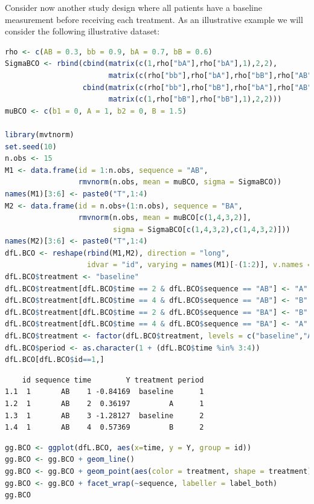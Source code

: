 \documentclass[12pt]{article}
\begin{document}
Consider now another study design where all patients have a baseline
measurement before receiving each treatment. As an illustrative
example we will consider the following illustrative dataset:
\begin{lstlisting}[language=r,numbers=none]
rho <- c(AB = 0.3, bb = 0.9, bA = 0.7, bB = 0.6)
SigmaBCO <- rbind(cbind(matrix(c(1,rho["bA"],rho["bA"],1),2,2),
                        matrix(c(rho["bb"],rho["bA"],rho["bB"],rho["AB"]),2,2)),
                  cbind(matrix(c(rho["bb"],rho["bB"],rho["bA"],rho["AB"]),2,2),
                        matrix(c(1,rho["bB"],rho["bB"],1),2,2)))
muBCO <- c(b1 = 0, A = 1, b2 = 0, B = 1.5)

library(mvtnorm)
set.seed(10)
n.obs <- 15
M1 <- data.frame(id = 1:n.obs, sequence = "AB",
                 rmvnorm(n.obs, mean = muBCO, sigma = SigmaBCO))
names(M1)[3:6] <- paste0("T",1:4)
M2 <- data.frame(id = n.obs+(1:n.obs), sequence = "BA",
                 rmvnorm(n.obs, mean = muBCO[c(1,4,3,2)],
                         sigma = SigmaBCO[c(1,4,3,2),c(1,4,3,2)]))
names(M2)[3:6] <- paste0("T",1:4)
dfL.BCO <- reshape(rbind(M1,M2), direction = "long",
                   idvar = "id", varying = names(M1)[-(1:2)], v.names = c("Y"), times = 1:4)
dfL.BCO$treatment <- "baseline"
dfL.BCO$treatment[dfL.BCO$time == 2 & dfL.BCO$sequence == "AB"] <- "A"
dfL.BCO$treatment[dfL.BCO$time == 4 & dfL.BCO$sequence == "AB"] <- "B"
dfL.BCO$treatment[dfL.BCO$time == 2 & dfL.BCO$sequence == "BA"] <- "B"
dfL.BCO$treatment[dfL.BCO$time == 4 & dfL.BCO$sequence == "BA"] <- "A"
dfL.BCO$treatment <- factor(dfL.BCO$treatment, levels = c("baseline","A","B"))
dfL.BCO$period <- as.character(1 + (dfL.BCO$time %in% 3:4))
dfL.BCO[dfL.BCO$id==1,]
\end{lstlisting}

\label{}
\begin{verbatim}
    id sequence time        Y treatment period
1.1  1       AB    1 -0.84169  baseline      1
1.2  1       AB    2  0.36197         A      1
1.3  1       AB    3 -1.28127  baseline      2
1.4  1       AB    4  0.57369         B      2
\end{verbatim}



\begin{lstlisting}[language=r,numbers=none]
gg.BCO <- ggplot(dfL.BCO, aes(x=time, y = Y, group = id))
gg.BCO <- gg.BCO + geom_line()
gg.BCO <- gg.BCO + geom_point(aes(color = treatment, shape = treatment), size = 3)
gg.BCO <- gg.BCO + facet_wrap(~sequence, labeller = label_both)
gg.BCO
\end{lstlisting}
\end{document}
